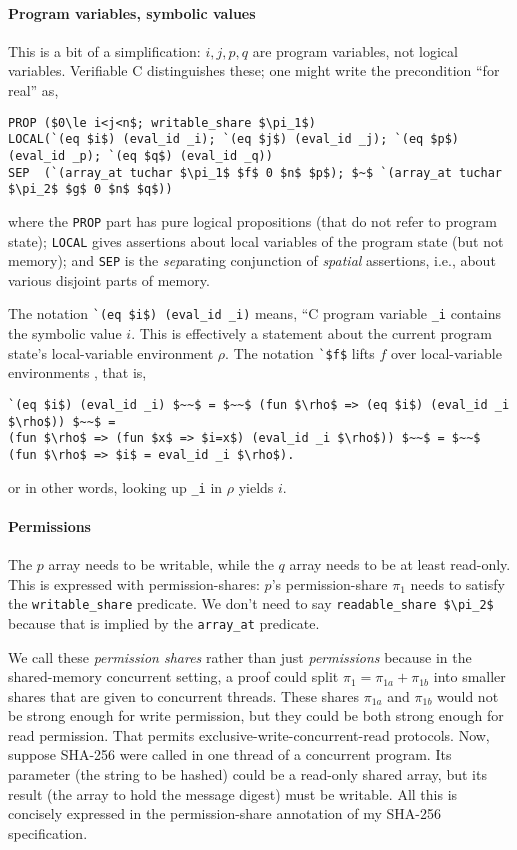 \documentclass[prodmode,acmtoplas]{acmsmall}
\begin{document}
\paragraph{Program variables, symbolic values}
This is a bit of a simplification: $i,j,p,q$ are program variables,
not logical variables.  Verifiable C distinguishes these; one might
write the precondition ``for real'' as,
\begin{lstlisting}
PROP ($0\le i<j<n$; writable_share $\pi_1$)
LOCAL(`(eq $i$) (eval_id _i); `(eq $j$) (eval_id _j); `(eq $p$) (eval_id _p); `(eq $q$) (eval_id _q))
SEP  (`(array_at tuchar $\pi_1$ $f$ 0 $n$ $p$); $~$ `(array_at tuchar $\pi_2$ $g$ 0 $n$ $q$))
\end{lstlisting}
where the \lstinline{PROP} part has
pure logical propositions (that do not refer to 
program state);
\lstinline{LOCAL} gives assertions about
local variables of the program state (but not memory);
and \lstinline{SEP} is the
\emph{sep}arating conjunction of \emph{spatial} assertions,
i.e., about various disjoint parts of memory.

The notation \lstinline{`(eq $i$) (eval_id _i)}
means, ``C program variable \lstinline{_i}
contains the symbolic value $i$.
This is effectively a statement about the current program state's
local-variable environment $\rho$.
The notation \lstinline{`$f$} lifts $f$ over
local-variable environments \cite[Chapter 21]{appel14:plcc},
that is,
\begin{lstlisting}
`(eq $i$) (eval_id _i) $~~$ = $~~$ (fun $\rho$ => (eq $i$) (eval_id _i $\rho$)) $~~$ =
(fun $\rho$ => (fun $x$ => $i=x$) (eval_id _i $\rho$)) $~~$ = $~~$ (fun $\rho$ => $i$ = eval_id _i $\rho$).
\end{lstlisting}
or in other words, looking up \lstinline{_i} in $\rho$ yields $i$.

\paragraph{Permissions}
The $p$ array needs to be writable, while the $q$ array
needs to be at least read-only.  This is expressed
with permission-shares:  $p$'s permission-share
$\pi_1$ needs to satisfy the \lstinline{writable_share}
predicate.  We don't need to say
\lstinline{readable_share $\pi_2$} because that is
implied by the \lstinline{array_at} predicate.

We call these \emph{permission shares} rather than just 
\emph{permissions} because in the shared-memory concurrent
setting, a proof could split $\pi_1=\pi_{1a} + \pi_{1b}$ into smaller shares
that are given to concurrent threads.  These shares
$\pi_{1a}$ and $\pi_{1b}$ would not be strong enough for write permission,
but they could be both strong enough for read permission.
That permits exclusive-write-concurrent-read protocols.
Now, suppose SHA-256 were called in one thread of a concurrent
program.  Its parameter (the string to be hashed) could be a
read-only shared array, but its result (the array to hold
the message digest) must be writable.  All this is 
concisely expressed in the permission-share annotation of my
SHA-256 specification.
\end{document}
